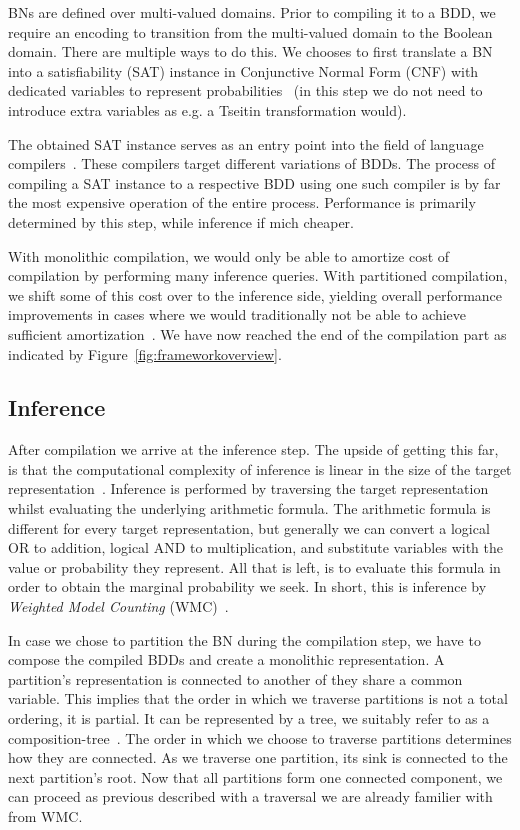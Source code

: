 BNs are defined over multi-valued domains. Prior to compiling it to a BDD, we require an encoding to transition from the multi-valued domain to the Boolean domain. There are multiple ways to do this. We chooses to first translate a BN into a satisfiability (SAT) instance in Conjunctive Normal Form (CNF) with dedicated variables to represent probabilities~\cite{chavira2008probabilistic,dal2017wpbdd} (in this step we do not need to introduce extra variables as e.g. a Tseitin transformation would).

The obtained SAT instance serves as an entry point into the field of language compilers~\cite{dudek2020addmc}. These compilers target different variations of BDDs. The process of compiling a SAT instance to a respective BDD using one such compiler is by far the most expensive operation of the entire process. Performance is primarily determined by this step, while inference if mich cheaper.

With monolithic compilation, we would only be able to amortize cost of compilation by performing many inference queries. With partitioned compilation, we shift some of this cost over to the inference side, yielding overall performance improvements in cases where we would traditionally not be able to achieve sufficient amortization~\cite{dal2017reducing}. We have now reached the end of the compilation part as indicated by Figure~\ref{fig:frameworkoverview}.

\subsection{Inference}\label{subsec:inference}

After compilation we arrive at the inference step. The upside of getting this far, is that the computational complexity of inference is linear in the size of the target representation~\cite{darwiche2002knowledge}. Inference is performed by traversing the target representation whilst evaluating the underlying arithmetic formula. The arithmetic formula is different for every target representation, but generally we can convert a logical OR to addition, logical AND to multiplication, and substitute variables with the value or probability they represent. All that is left, is to evaluate this formula in order to obtain the marginal probability we seek. In short, this is inference by \emph{Weighted Model Counting} (WMC)~\cite{chavira2008probabilistic}.

In case we chose to partition the BN during the compilation step, we have to compose the compiled BDDs and create a monolithic representation. A partition's representation is connected to another of they share a common variable. This implies that the order in which we traverse partitions is not a total ordering, it is partial. It can be represented by a tree, we suitably refer to as a composition-tree~\cite{dal2021compositional}. The order in which we choose to traverse partitions determines how they are connected. As we traverse one partition, its sink is connected to the next partition's root. Now that all partitions form one connected component, we can proceed as previous described with a traversal we are already familier with from WMC.


